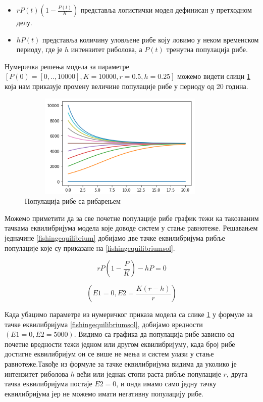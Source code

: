 \documentclass[a4paper]{article}
\begin{document}
{\begin{itemize}
  \item $ rP(t)\left(1-\frac{P(t)}{K}\right)$ представља логистички модел дефинисан у претходном делу.
  \item $hP(t)$  представља количину уловљене рибе коју ловимо у неком временском периоду, где је $h$ интензитет риболова, а $P(t)$ тренутна популација рибе.
\end{itemize}

Нумеричка решења модела за параметре $[P(0)=[0,..,10000],  K=10000, r=0.5, h=0.25] $ можемо видети слици \ref{fishingmodel_view} која нам приказује промену величине популације рибе у периоду од 20 година.

 \begin{figure}[h!]
	\centering
	\includegraphics[width=10cm,height=5cm]{images/FishingModel.png}
	\caption{Популација рибе са рибарењем}
	\label{fishingmodel_view}
\end{figure}

 Можемо приметити да за све почетне популације рибе график тежи ка такозваним тачкама еквилибријума модела које доводе систем у стање равнотеже. Решавањем једначине \ref{fishingequilibrium} добијамо две тачке еквилибријума рибље популације које су приказане на \ref{fishingequilibriumsol}.

\begin{equation}
    \label{fishingequilibrium}
    rP\left(1-\frac{P}{K}\right) - hP = 0
\end{equation}

\begin{equation}
    \label{fishingequilibriumsol}
     \left(E1 = 0,   E2 = \frac{K(r - h) }{r}\right)
\end{equation}

Када убацимо параметре из нумеричког приказа модела са слике \ref{fishingmodel_view} у формуле за тачке еквилибријума \ref{fishingequilibriumsol}, добијамо вредности $(E1=0, E2=5000)$. Видимо са графика да популација рибе зависно од почетне вредности тежи једном или другом еквилибријуму, када број рибе достигне еквилибријум он се више не мења и систем улази у стање равнотеже.Такође из формуле за тачке еквилибријума видима да уколико је интензитет риболова $h$ већи или једнак стопи раста рибље популације $r$, друга тачка еквилибријума постаје $E2=0$, и онда имамо само једну тачку еквилибријума јер не можемо имати негативну популацију рибе.


}
\end{document}
